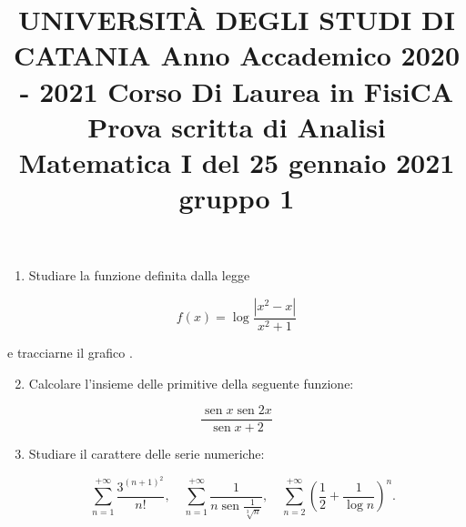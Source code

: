 \documentclass[10pt]{article}
\title{UNIVERSITÀ DEGLI STUDI DI CATANIA 
 Anno Accademico 2020 - 2021 
 Corso Di Laurea in FisiCA 
 Prova scritta di Analisi Matematica I del 25 gennaio 2021 
 gruppo 1 }
\author{}
\date{}
\begin{document}
\maketitle
\begin{enumerate}
  \item Studiare la funzione definita dalla legge
\end{enumerate}

\[
f(x)=\log \frac{\left|x^{2}-x\right|}{x^{2}+1}
\]

e tracciarne il grafico .

\begin{enumerate}
  \setcounter{enumi}{1}
  \item Calcolare l'insieme delle primitive della seguente funzione:
\end{enumerate}

\[
\frac{\operatorname{sen} x \operatorname{sen} 2 x}{\operatorname{sen} x+2}
\]

\begin{enumerate}
  \setcounter{enumi}{2}
  \item Studiare il carattere delle serie numeriche:
\end{enumerate}

\[
\quad \sum_{n=1}^{+\infty} \frac{3^{(n+1)^{2}}}{n !}, \quad \sum_{n=1}^{+\infty} \frac{1}{n \operatorname{sen} \frac{1}{\sqrt[3]{n}}}, \quad \sum_{n=2}^{+\infty}\left(\frac{1}{2}+\frac{1}{\log n}\right)^{n} .
\]
\end{document}
